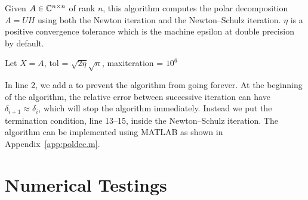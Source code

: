 \documentclass[12pt]{article}
\begin{document}
\begin{algorithm}[hbt!]
    \caption{Given $A\in\mathbb{C}^{n\times n}$ of rank $n$, this algorithm computes the polar decomposition $A = UH$ using both the Newton iteration and the Newton--Schulz iteration. $\eta$ is a positive convergence tolerance which is the machine epsilon at double precision by default.}
    \label{alg:poldec}
    \begin{algorithmic}[1]
        \State Let $X = A$, 
        \State tol = $\sqrt{2\eta}\sqrt{n}$, maxiteration = $10^6$
            \EndIf
                \EndIf
            \Else 
            \EndIf
        \EndFor
    \end{algorithmic}
\end{algorithm}

In line 2, we add a  to prevent the algorithm from going forever.
At the beginning of the algorithm, the relative error between successive iteration can have $\delta_{i+1} \approx \delta_i$, which will stop the algorithm immediately. Instead we put the termination condition, line 13--15, inside the Newton--Schulz iteration.
The algorithm can be implemented  using MATLAB as shown in Appendix~\ref{app:poldec.m}.

\section{Numerical Testings}
\end{document}

